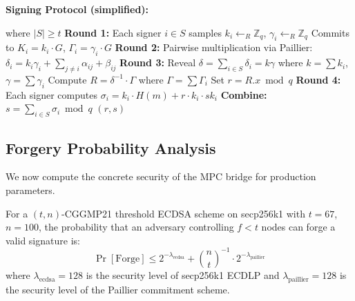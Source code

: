 \textbf{Signing Protocol (simplified):}
\begin{algorithm}[H]
\caption{CGGMP21 Threshold ECDSA Signing}
\begin{algorithmic}[1]
 where $|S| \geq t$
    \State \textbf{Round 1:} Each signer $i \in S$ samples $k_i \gets_R \mathbb{Z}_q$, $\gamma_i \gets_R \mathbb{Z}_q$
    \State \quad Commits to $K_i = k_i \cdot G$, $\Gamma_i = \gamma_i \cdot G$
    \State \textbf{Round 2:} Pairwise multiplication via Paillier: $\delta_i = k_i \gamma_i + \sum_{j \neq i} \alpha_{ij} + \beta_{ij}$
    \State \textbf{Round 3:} Reveal $\delta = \sum_{i \in S} \delta_i = k \gamma$ where $k = \sum k_i$, $\gamma = \sum \gamma_i$
    \State \quad Compute $R = \delta^{-1} \cdot \Gamma$ where $\Gamma = \sum \Gamma_i$
    \State \quad Set $r = R.x \bmod q$
    \State \textbf{Round 4:} Each signer computes $\sigma_i = k_i \cdot H(m) + r \cdot k_i \cdot sk_i$
    \State \textbf{Combine:} $s = \sum_{i \in S} \sigma_i \bmod q$
    \State \Return $(r, s)$
\EndFunction
\end{algorithmic}
\end{algorithm}

\subsection{Forgery Probability Analysis}

We now compute the concrete security of the MPC bridge for production parameters.

\begin{theorem}\label{thm:cggmp21-security}
For a $(t, n)$-CGGMP21 threshold ECDSA scheme on \textup{secp256k1} with $t = 67$, $n = 100$, the probability that an adversary controlling $f < t$ nodes can forge a valid signature is:
\begin{equation}
\Pr[\text{Forge}] \leq 2^{-\lambda_{\text{ecdsa}}} + \binom{n}{t}^{-1} \cdot 2^{-\lambda_{\text{paillier}}}
\end{equation}
where $\lambda_{\text{ecdsa}} = 128$ is the security level of secp256k1 ECDLP and $\lambda_{\text{paillier}} = 128$ is the security level of the Paillier commitment scheme.
\end{theorem}


